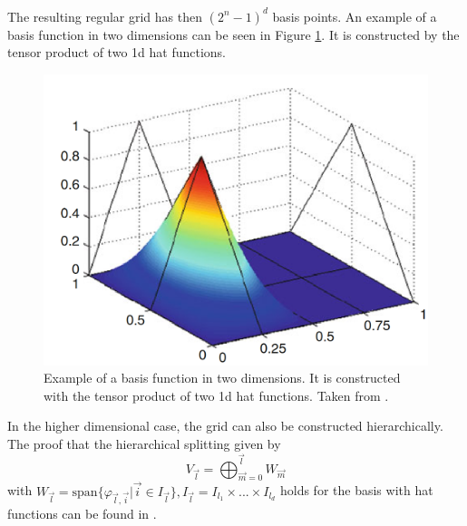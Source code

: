 The resulting regular grid has then $ (2^n - 1)^d $ basis points. An example of a basis function in two dimensions can be seen in Figure \ref{fig:2d_basis}. It is constructed by the tensor product of two 1d hat functions. 

\begin{figure}[htbp!]
	\centering
	\includegraphics[scale=0.26]{figures/2d_basis.png}
	\caption{ Example of a basis function in two dimensions. It is constructed with the tensor product of two 1d hat functions. Taken from \cite{garcke2013sparse}. }
	\label{fig:2d_basis}
\end{figure}

In the higher dimensional case, the grid can also be constructed hierarchically. The proof that the hierarchical splitting given by 
\begin{equation}
	V_{\vec{l}} = \bigoplus_{\vec{m} = 0}^{\vec{l}} W_{\vec{m}}
\end{equation}
with $ W_{\vec{l}} = \text{span}\{\varphi_{\vec{l}, \vec{i}} | \vec{i} \in I_{\vec{l}}\}, I_{\vec{l}} = I_{l_1} \times ... \times I_{l_d} $ holds for the basis with hat functions can be found in \cite{b_splines}.


